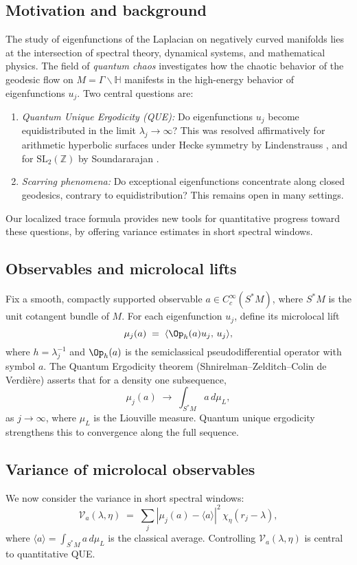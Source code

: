 \subsection{Motivation and background}
The study of eigenfunctions of the Laplacian on negatively curved manifolds lies at the intersection of spectral theory, dynamical systems, and mathematical physics. The field of \emph{quantum chaos} investigates how the chaotic behavior of the geodesic flow on $M=\Gamma\backslash\mathbb{H}$ manifests in the high-energy behavior of eigenfunctions $u_j$. Two central questions are:
\begin{enumerate}
\item \emph{Quantum Unique Ergodicity (QUE):} Do eigenfunctions $u_j$ become equidistributed in the limit $\lambda_j\to\infty$? This was resolved affirmatively for arithmetic hyperbolic surfaces under Hecke symmetry by Lindenstrauss \cite{Lindenstrauss2006}, and for $\mathrm{SL}_2(\mathbb{Z})$ by Soundararajan \cite{Soundararajan2010}.
\item \emph{Scarring phenomena:} Do exceptional eigenfunctions concentrate along closed geodesics, contrary to equidistribution? This remains open in many settings.
\end{enumerate}
Our localized trace formula provides new tools for quantitative progress toward these questions, by offering variance estimates in short spectral windows.

\subsection{Observables and microlocal lifts}
Fix a smooth, compactly supported observable $a\in C_c^\infty(S^*M)$, where $S^*M$ is the unit cotangent bundle of $M$. For each eigenfunction $u_j$, define its microlocal lift
\[
\mu_j(a)\;=\;\langle \Op_h(a)u_j,\,u_j\rangle,
\]
where $h=\lambda_j^{-1}$ and $\Op_h(a)$ is the semiclassical pseudodifferential operator with symbol $a$. The Quantum Ergodicity theorem (Shnirelman–Zelditch–Colin de Verdière) asserts that for a density one subsequence,
\[
\mu_j(a)\;\to\;\int_{S^*M} a\, d\mu_{L},
\]
as $j\to\infty$, where $\mu_L$ is the Liouville measure. Quantum unique ergodicity strengthens this to convergence along the full sequence.

\subsection{Variance of microlocal observables}
We now consider the variance in short spectral windows:
\[
\mathcal{V}_a(\lambda,\eta)\;=\;\sum_j |\mu_j(a)-\langle a\rangle|^2\,\chi_\eta(r_j-\lambda),
\]
where $\langle a\rangle=\int_{S^*M} a\,d\mu_L$ is the classical average. Controlling $\mathcal{V}_a(\lambda,\eta)$ is central to quantitative QUE.

